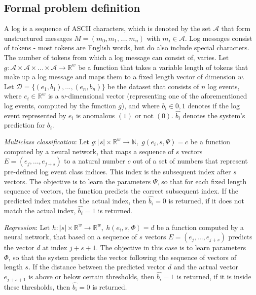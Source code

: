 \subsection{Formal problem definition \label{sec:formal_problem_definition}}
A log is a sequence of ASCII characters, which is denoted by the set $\mathcal{A}$ that form unstructured messages $M = (m_0, m_1, ..., m_n)$ with $m_i \in \mathcal{A}$. Log messages consist of tokens - most tokens are English words, but do also include special characters. The number of tokens from which a log message can consist of, varies. 
Let $g: \mathcal{A}\times\mathcal{A} \times ...\times \mathcal{A} \rightarrow \mathbb{R}^w$ be a function that takes a variable length of tokens that make up a log message and maps them to a fixed length vector of dimension $w$. Let $\mathcal{D} = \{(e_1,b_1), ..., (e_n,b_n)\}$ be the dataset that consists of $n$ log events, where $e_i \in \mathbb{R}^w$ is a $w$-dimensional vector (representing one of the aforementioned log events, computed by the function $g$), and where $b_i \in {0,1}$ denotes if the log event represented by $e_i$ is anomalous $(1)$ or not $(0)$. $\hat{b_i}$ denotes the system's prediction for $b_i$.

\textit{Multiclass classification}: Let $g: \left|s\right| \times \mathbb{R}^w \rightarrow \mathbb{N},\;  g(e_i, s, \Psi) = c$ be a function computed by a neural network, that maps a sequence of $s$ vectors $E = (e_j, ..., e_{j+s})$ to a natural number $c$ out of a set of numbers that represent pre-defined log event class indices. This index is the subsequent index after $s$ vectors. The objective is to learn the parameters $\Psi$, so that for each fixed length sequence of vectors, the function predicts the correct subsequent index. If the predicted index matches the actual index, then $\hat{b_i} = 0$ is returned, if it does not match the actual index, $\hat{b_i} = 1$ is returned.

\textit{Regression}: Let $h: \left|s\right| \times \mathbb{R}^w \rightarrow \mathbb{R}^w, \; h(e_i, s, \Phi)=d$ be a function computed by a neural network, that based on a sequence of $s$ vectors $E = (e_j, ..., e_{j+s})$ predicts the vector $d$ at index $j+s+1$. The objective in this case is to learn parameters $\Phi$, so that the system predicts the vector following the sequence of vectors of length $s$. If the distance between the predicted vector $d$ and the actual vector $e_{j+s+1}$ is above or below certain thresholds, then $\hat{b_i} = 1$ is returned, if it is inside these thresholds, then $\hat{b_i} = 0$ is returned.

